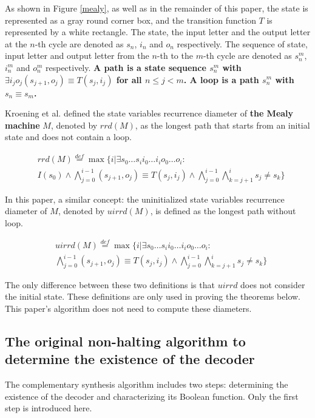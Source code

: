 \documentclass[journal]{IEEEtran}
\begin{document}
As shown in Figure \ref{mealy},
as well as in the remainder of this paper,
the state is represented as a gray round corner box,
and the transition function $T$ is represented by a white rectangle.
The state, the input letter and the output letter at the $n$-th cycle are denoted as $s_n$, $i_n$ and $o_n$ respectively.
The sequence of state, input letter and output letter from the $n$-th to the $m$-th cycle are denoted as $s_n^m$, $i_n^m$ and $o_n^m$ respectively.
\textbf{A path is a state sequence $s_n^{m}$ with $\exists i_jo_j (s_{j+1},o_j)\equiv T(s_j,i_j)$ for all $n\le j< m$.
A loop is a path $s_n^{m}$ with $s_n\equiv s_m$.}


Kroening et al. \cite{RecDiam} defined the state variables recurrence diameter of \textbf{the Mealy machine} $M$,
denoted by $rrd(M)$,
as the longest path that starts from an initial state and does not contain a loop.

\begin{equation}\label{equ_svrd}
\begin{split}
&rrd(M)\overset{def}{=}\max\{i|\exists s_0 \dots s_i i_0 \dots i_i o_0 \dots o_i:\\
& I(s_0)\wedge \bigwedge^{i-1}_{j=0}(s_{j+1},o_j)\equiv T(s_j,i_j)\wedge\bigwedge^{i-1}_{j=0}\bigwedge^{i}_{k=j+1}s_{j}\ne s_{k}\}
\end{split}
\end{equation}

In this paper,
a similar concept: the uninitialized state variables recurrence diameter of $M$,
denoted by $uirrd(M)$,
is defined as the longest path without loop.

\begin{equation}\label{equ_uisvrd}
\begin{split}
&uirrd(M)\overset{def}{=}\max\{i|\exists s_0 \dots s_i i_0 \dots i_i o_0 \dots o_i:\\
&\bigwedge^{i-1}_{j=0}(s_{j+1},o_j)\equiv T(s_j,i_j)\wedge\bigwedge^{i-1}_{j=0}\bigwedge^{i}_{k=j+1}s_{j}\ne s_{k}\}
\end{split}
\end{equation}

The only difference between these two definitions is that $uirrd$ does not consider the initial state.
These definitions are only used in proving the theorems below.
This paper's algorithm does not need to compute these diameters.

\subsection{The original non-halting algorithm to determine the existence of the decoder}\label{subsec_chkextdec}
The complementary synthesis algorithm\cite{ShengYuShen:iccad09} includes two steps:
determining the existence of the decoder and characterizing its Boolean function.
Only the first step is introduced here.
\end{document}

